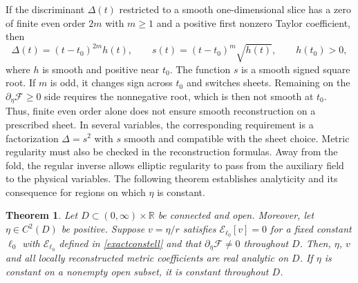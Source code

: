 \documentclass[amsmath,amsfonts,amssymb,aps,pra,superscriptaddress,10pt]{revtex4-2}
\numberwithin{equation}{section}
\theoremstyle{plain}
\newtheorem{theorem}{Theorem}
\theoremstyle{definition}
\theoremstyle{remark}
\theoremstyle{definition}
\newcommand{\ellzero}{\ell_0}
\newcommand{\EE}{\mathcal E_{\ellzero}}
\begin{document}
If the discriminant $\Delta(t)$ restricted to a smooth one-dimensional slice has a zero of finite even order $2m$ with $m\geq 1$ and a positive first nonzero Taylor coefficient, then
\begin{equation}
\Delta(t)=(t-t_0)^{2m}h(t),\qquad
s(t)=(t-t_0)^m\sqrt{h(t)},\qquad 
h(t_0)>0,
\end{equation}
where $h$ is smooth and positive near $t_0$. The function $s$ is a smooth signed square root. If $m$ is odd, it changes sign across $t_0$ and switches sheets. Remaining on the $\partial_\eta\mathcal{F}\geq 0$ side requires the nonnegative root, which is then not smooth at $t_0$. Thus, finite even order alone does not ensure smooth reconstruction on a prescribed sheet. In several variables, the corresponding requirement is a factorization $\Delta=s^2$ with $s$ smooth and compatible with the sheet choice. Metric regularity must also be checked in the reconstruction formulas. Away from the fold, the regular inverse allows elliptic regularity to pass from the auxiliary field to the physical variables. The following theorem establishes analyticity and its consequence for regions on which $\eta$ is constant.

\begin{theorem}\label{autanal}
Let $D\subset(0,\infty)\times\mathbb R$ be connected and open. Moreover, let $\eta\in C^2(D)$ be positive. Suppose $v=\eta/r$ satisfies $\EE[v]=0$ for a fixed constant $\ellzero$ with $\EE$ defined in \eqref{exactconstell}  and that $\partial_\eta\mathcal{F}\neq 0$ throughout $D$. Then, $\eta$, $v$ and all locally reconstructed metric coefficients are real analytic on $D$. If $\eta$ is constant on a nonempty open subset, it is constant throughout $D$.
\end{theorem}
\end{document}

